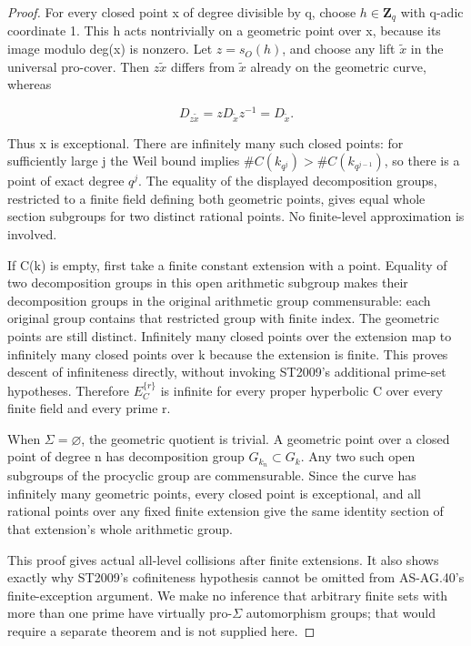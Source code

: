 \documentclass[11pt,a4paper]{article}
\begin{document}
\begin{proof}
For every closed point x of degree divisible by q, choose \(h{\in}\mathbf{Z}_q\) with q-adic coordinate 1. This h acts nontrivially on a geometric point over x, because its image modulo deg(x) is nonzero. Let \(z=s_O(h)\), and choose any lift \(\tilde{x}\) in the universal pro-cover. Then \(z\tilde{x}\) differs from \(\tilde{x}\) already on the geometric curve, whereas

\[D_{z\tilde{x}}=zD_{\tilde{x}}z^{-1}=D_{\tilde{x}}.\]

Thus x is exceptional. There are infinitely many such closed points: for sufficiently large j the Weil bound implies \(\#C(k_{q^j})>\#C(k_{q^{j-1}})\), so there is a point of exact degree \(q^j\). The equality of the displayed decomposition groups, restricted to a finite field defining both geometric points, gives equal whole section subgroups for two distinct rational points. No finite-level approximation is involved.

If C(k) is empty, first take a finite constant extension with a point. Equality of two decomposition groups in this open arithmetic subgroup makes their decomposition groups in the original arithmetic group commensurable: each original group contains that restricted group with finite index. The geometric points are still distinct. Infinitely many closed points over the extension map to infinitely many closed points over k because the extension is finite. This proves descent of infiniteness directly, without invoking ST2009's additional prime-set hypotheses. Therefore \(E_C^{\{r\}}\) is infinite for every proper hyperbolic C over every finite field and every prime r.

When \(\Sigma=\varnothing\), the geometric quotient is trivial. A geometric point over a closed point of degree n has decomposition group \(G_{k_n}\subset G_k\). Any two such open subgroups of the procyclic group are commensurable. Since the curve has infinitely many geometric points, every closed point is exceptional, and all rational points over any fixed finite extension give the same identity section of that extension's whole arithmetic group.

This proof gives actual all-level collisions after finite extensions. It also shows exactly why ST2009's cofiniteness hypothesis cannot be omitted from AS-AG.40's finite-exception argument. We make no inference that arbitrary finite sets with more than one prime have virtually pro-\({\Sigma}\) automorphism groups; that would require a separate theorem and is not supplied here.


\end{proof}
\end{document}
